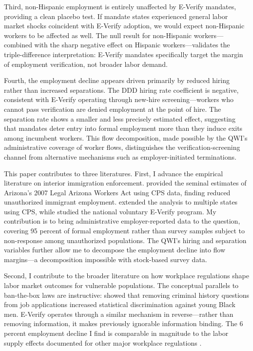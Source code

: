 \documentclass[12pt]{article}
\begin{document}
Third, non-Hispanic employment is entirely unaffected by E-Verify mandates, providing a clean placebo test. If mandate states experienced general labor market shocks coincident with E-Verify adoption, we would expect non-Hispanic workers to be affected as well. The null result for non-Hispanic workers---combined with the sharp negative effect on Hispanic workers---validates the triple-difference interpretation: E-Verify mandates specifically target the margin of employment verification, not broader labor demand.

Fourth, the employment decline appears driven primarily by reduced hiring rather than increased separations. The DDD hiring rate coefficient is negative, consistent with E-Verify operating through new-hire screening---workers who cannot pass verification are denied employment at the point of hire. The separation rate shows a smaller and less precisely estimated effect, suggesting that mandates deter entry into formal employment more than they induce exits among incumbent workers. This flow decomposition, made possible by the QWI's administrative coverage of worker flows, distinguishes the verification-screening channel from alternative mechanisms such as employer-initiated terminations.

This paper contributes to three literatures. First, I advance the empirical literature on interior immigration enforcement. \citet{bohn2014} provided the seminal estimates of Arizona's 2007 Legal Arizona Workers Act using CPS data, finding reduced unauthorized immigrant employment. \citet{orrenius2016} extended the analysis to multiple states using CPS, while \citet{amuedo2012} studied the national voluntary E-Verify program. My contribution is to bring administrative employer-reported data to the question, covering 95 percent of formal employment rather than survey samples subject to non-response among unauthorized populations. The QWI's hiring and separation variables further allow me to decompose the employment decline into flow margins---a decomposition impossible with stock-based survey data.

Second, I contribute to the broader literature on how workplace regulations shape labor market outcomes for vulnerable populations. The conceptual parallels to ban-the-box laws are instructive: \citet{doleac2020} showed that removing criminal history questions from job applications increased statistical discrimination against young Black men. E-Verify operates through a similar mechanism in reverse---rather than removing information, it makes previously ignorable information binding. The 6 percent employment decline I find is comparable in magnitude to the labor supply effects documented for other major workplace regulations \citep{autor2003,neumark2014}.
\end{document}
